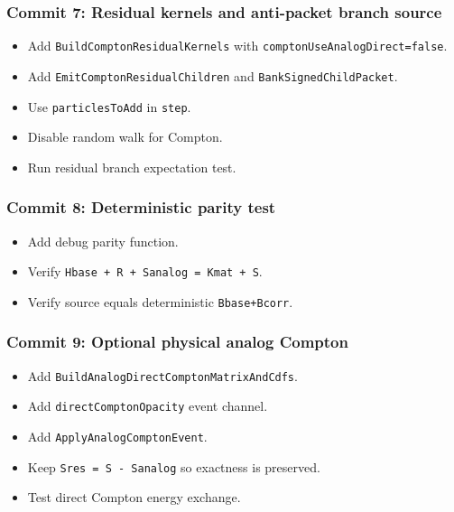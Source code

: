 \documentclass[
]{article}
\providecommand{\tightlist}{%
  \setlength{\itemsep}{0pt}\setlength{\parskip}{0pt}}
\begin{document}
\subsubsection{Commit 7: Residual kernels and anti-packet branch
source}\label{commit-7-residual-kernels-and-anti-packet-branch-source}

\begin{itemize}
\tightlist
\item
  Add \texttt{BuildComptonResidualKernels} with
  \texttt{comptonUseAnalogDirect=false}.
\item
  Add \texttt{EmitComptonResidualChildren} and
  \texttt{BankSignedChildPacket}.
\item
  Use \texttt{particlesToAdd} in \texttt{step}.
\item
  Disable random walk for Compton.
\item
  Run residual branch expectation test.
\end{itemize}

\subsubsection{Commit 8: Deterministic parity
test}\label{commit-8-deterministic-parity-test}

\begin{itemize}
\tightlist
\item
  Add debug parity function.
\item
  Verify \texttt{Hbase\ +\ R\ +\ Sanalog\ =\ Kmat\ +\ S}.
\item
  Verify source equals deterministic \texttt{Bbase+Bcorr}.
\end{itemize}

\subsubsection{Commit 9: Optional physical analog
Compton}\label{commit-9-optional-physical-analog-compton}

\begin{itemize}
\tightlist
\item
  Add \texttt{BuildAnalogDirectComptonMatrixAndCdfs}.
\item
  Add \texttt{directComptonOpacity} event channel.
\item
  Add \texttt{ApplyAnalogComptonEvent}.
\item
  Keep \texttt{Sres\ =\ S\ -\ Sanalog} so exactness is preserved.
\item
  Test direct Compton energy exchange.
\end{itemize}
\end{document}
